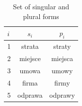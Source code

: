 \documentclass{article}
\begin{document}
  \begin{table}[ht]

      \center
  \begin{tabular}{|l|c|c|}
  \hline
  $i$ & $s_i$ & $p_i$ \\ \hline
  1 & strata & straty \\ \hline
  2 & miejsce & miejsca \\ \hline
  3 & umowa & umowy \\ \hline
  4 & firma & firmy \\ \hline
  5 & odprawa & odprawy \\ \hline
  \end{tabular}
  \caption{Set of singular and plural forms}
  \label{tab:sinpl_set}
  \end{table}
\end{document}
